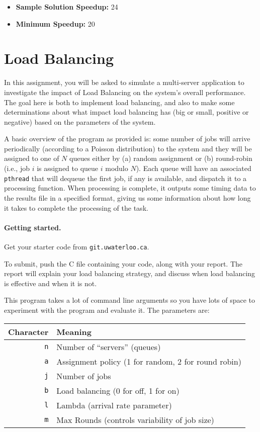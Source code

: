 \documentclass[letterpaper,10pt]{article}
\begin{document}
\begin{itemize}
\item \textbf{Sample Solution Speedup:} 24
\item \textbf{Minimum Speedup:} 20
\end{itemize}

\newpage
\section{Load Balancing}

In this assignment, you will be asked to simulate a multi-server application to investigate the impact of Load Balancing on the system's overall performance. The goal here is both to implement load balancing, and also to make some determinations about what impact load balancing has (big or small, positive or negative) based on the parameters of the system. 

A basic overview of the program as provided is: some number of jobs will arrive periodically (according to a Poisson distribution) to the system and they will be assigned to one of $N$ queues either by (a) random assignment or (b) round-robin (i.e., job $i$ is assigned to queue $i$ modulo $N$). Each queue will have an associated \texttt{pthread} that will dequeue the first job, if any is available, and dispatch it to a processing function. When processing is complete, it outputs some timing data to the results file in a specified format, giving us some information about how long it takes to complete the processing of the task.


\paragraph{Getting started.} Get your starter code from \texttt{git.uwaterloo.ca}.

To submit, push the C file containing your code, along with your report. The report will explain your load balancing strategy, and discuss when load balancing is effective and when it is not.

This program takes a lot of command line arguments so you have lots of space to experiment with the program and evaluate it. The parameters are:

\begin{center}
	\begin{tabular}{r|l}
	\textbf{Character} & \textbf{Meaning} \\ \hline
	\texttt{n} & Number of ``servers'' (queues) \\
	\texttt{a} & Assignment policy (1 for random, 2 for round robin) \\
	\texttt{j} & Number of jobs \\
	\texttt{b} & Load balancing (0 for off, 1 for on) \\
	\texttt{l} & Lambda (arrival rate parameter) \\
	\texttt{m} & Max Rounds (controls variability of job size) \\
	\end{tabular}
\end{center}
\end{document}
